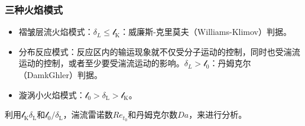\subsubsection{三种火焰模式}

\begin{itemize}
    \item 褶皱层流火焰模式：\(\delta_L\le \mathcal{l}_\mathrm{K}\)：威廉斯-克里莫夫（Williams-Klimov）判据。
    \item 分布反应模式：反应区内的输运现象就不仅受分子运动的控制，同时也受湍流运动的控制，或者至少要受湍流运动的影响。\(\delta_L > \mathcal{l}_0\)：丹姆克尔（DamkGhler）判据。
    \item 漩涡小火焰模式：\(\mathcal{l}_0 > \delta_\mathrm{L} > \mathcal{l}_\mathrm{K}\)。
\end{itemize}

利用\(\mathcal{l}_\mathrm{K}\delta_\mathrm{L}\)和\(\mathcal{l}_0/\delta_\mathrm{L}\)，湍流雷诺数\(Re_{t_0}\)和丹姆克尔数\(Da\)，来进行分析。